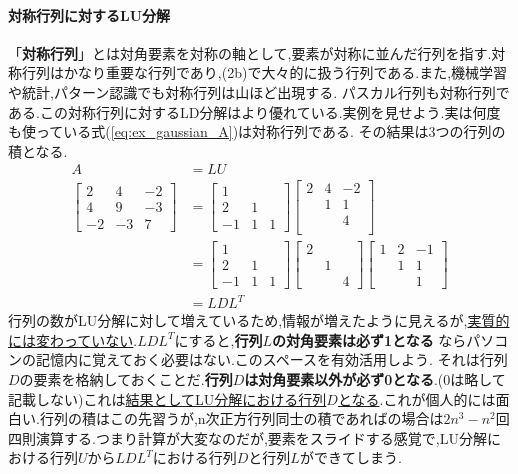 \paragraph{対称行列に対するLU分解}
「\textbf{対称行列}」とは対角要素を対称の軸として,要素が対称に並んだ行列を指す.対称行列はかなり重要な行列であり,(2b)で大々的に扱う行列である.また,機械学習や統計,パターン認識でも対称行列は山ほど出現する.
パスカル行列も対称行列である.この対称行列に対するLD分解はより優れている.実例を見せよう.実は何度も使っている式(\ref{eq:ex_gaussian_A})は対称行列である.
その結果は3つの行列の積となる.\newpage
\begin{align*}
    A &= LU \\
    \begin{bmatrix}
        2 & 4 & -2 \\ 4 & 9 & -3 \\ -2 & -3 & 7
    \end{bmatrix} 
    &=
    \begin{bmatrix}
        1 &  &  \\ 2 & 1 &  \\ -1 & 1 & 1
    \end{bmatrix}
    \begin{bmatrix}
        2& 4 & -2 \\  & 1 & 1 \\  &  & 4 \\
    \end{bmatrix} \\
    &=
    \begin{bmatrix}
        1 &  &  \\ 2 & 1 &  \\ -1 & 1 & 1
    \end{bmatrix}
    \begin{bmatrix}
        2 & & \\ & 1 & \\ && 4
    \end{bmatrix}
    \begin{bmatrix}
    1& 2 & -1 \\  & 1 & 1 \\  &  & 1 
    \end{bmatrix}\\
    &= LDL^T
\end{align*}
行列の数がLU分解に対して増えているため,情報が増えたように見えるが,\underline{実質的には変わっていない}.$LDL^T$にすると,\textbf{行列$L$の対角要素は必ず1となる}
ならパソコンの記憶内に覚えておく必要はない.このスペースを有効活用しよう.
それは行列$D$の要素を格納しておくことだ.\textbf{行列$D$は対角要素以外が必ず0となる}.(0は略して記載しない)これは\underline{結果としてLU分解における行列$D$となる}.これが個人的には面白い.行列の積はこの先習うが,n次正方行列同士の積であればの場合は$2n^3-n^2$回四則演算する.つまり計算が大変なのだが,要素をスライドする感覚で,LU分解における行列$U$から$LDL^T$における行列$D$と行列$L$ができてしまう.
